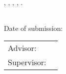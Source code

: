 
\thispagestyle{empty}

\ \vfill

\noindent%
\myName{}, \emph{\myTitle{}}, \myDegree, \myUni{}, \myYearPublication{}.

\bigskip

\noindent\myThesiscode{} \\
Date of submission: \myTime{}

\bigskip

\noindent\begin{tabular}{@{}l@{~}l@{}}
Advisor: & \myProf{} \\
Supervisor: & \mySupervisor{} \\
\end{tabular}

\bigskip

\noindent%
\myDepartment{} \\
\myFaculty{} \\
\myUni{}










